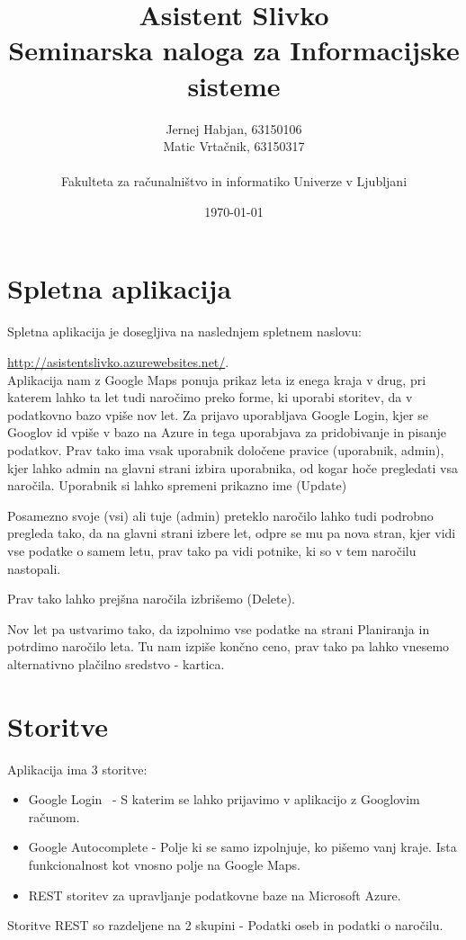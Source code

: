 \documentclass[11pt,a4paper]{article}
\title{Asistent Slivko \\
\large Seminarska naloga za Informacijske sisteme}
\author{
Jernej Habjan, 63150106  \\
Matic Vrtačnik, 63150317 \\
\ \\
Fakulteta za računalništvo in informatiko Univerze v Ljubljani
\date{\today}         
}
\begin{document}
\maketitle



\section{Spletna aplikacija}

Spletna aplikacija je dosegljiva na naslednjem spletnem naslovu: 

\href{http://asistentslivko.azurewebsites.net/}{http://asistentslivko.azurewebsites.net/}.\\
Aplikacija nam z Google Maps ponuja prikaz leta iz enega kraja v drug, pri katerem lahko ta let tudi naročimo preko forme, ki uporabi storitev, da v podatkovno bazo vpiše nov let.
Za prijavo uporabljava Google Login, kjer se Googlov id vpiše v bazo na Azure in tega uporabjava za pridobivanje in pisanje podatkov.
Prav tako ima vsak uporabnik določene pravice (uporabnik, admin), kjer lahko admin na glavni strani izbira uporabnika, od kogar hoče pregledati vsa naročila.
Uporabnik si lahko spremeni prikazno ime (Update)

Posamezno svoje (vsi) ali tuje (admin) preteklo naročilo lahko tudi podrobno pregleda tako, da na glavni strani izbere let, odpre se mu pa nova stran, kjer vidi vse podatke o samem letu, prav tako pa vidi potnike, ki so v tem naročilu nastopali.

Prav tako lahko prejšna naročila izbrišemo (Delete).

Nov let pa ustvarimo tako, da izpolnimo vse podatke na strani Planiranja in potrdimo naročilo leta. Tu nam izpiše končno ceno, prav tako pa lahko vnesemo alternativno plačilno sredstvo - kartica.

\section{Storitve}
Aplikacija ima 3 storitve:
\begin{itemize}
	\item Google Login~\cite{signIn} - S katerim se lahko prijavimo v aplikacijo z Googlovim računom.
	\item Google Autocomplete\cite{autocomplete} - Polje ki se samo izpolnjuje, ko pišemo vanj kraje. Ista funkcionalnost kot vnosno polje na Google Maps.
	\item REST storitev za upravljanje podatkovne baze na Microsoft Azure.
\end{itemize}
Storitve REST so razdeljene na 2 skupini - Podatki oseb in podatki o naročilu.
\end{document}

